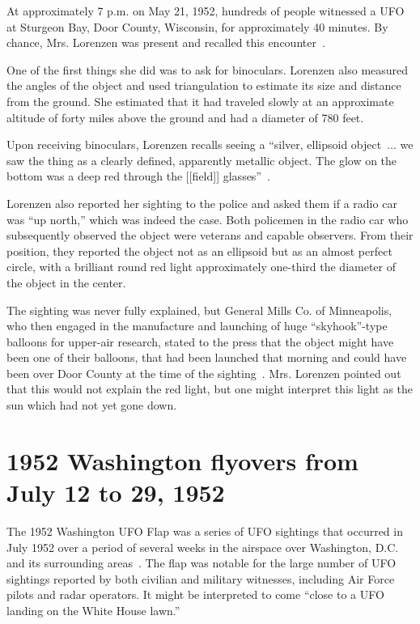 
At approximately 7 p.m. on May 21, 1952, hundreds of people witnessed a UFO at Sturgeon Bay, Door County, Wisconsin, for approximately 40 minutes.
By chance, Mrs. Lorenzen was present and recalled this encounter~\cite[Chapter~3]{Lorenzen1966Jan}.

One of the first things she did was to ask for binoculars. Lorenzen also measured the angles of the object and used triangulation to estimate its size and distance from the ground. She estimated that it had traveled slowly at an approximate altitude of
forty miles above the ground and had a diameter of 780 feet.

Upon receiving binoculars, Lorenzen recalls seeing a ``silver, ellipsoid object~$\ldots$ we saw the thing as a clearly
defined, apparently metallic object. The glow on the bottom
was a deep red through the [[field]] glasses''~\cite[pp.~31,~33]{Lorenzen1966Jan}.

Lorenzen also reported her sighting to the police and asked them if a radio car was ``up north,''
which was indeed the case. Both policemen in the radio car who subsequently observed the object were veterans and capable observers.
From their position, they reported the object not as an ellipsoid but as an almost perfect circle,
with a brilliant round red light approximately one-third the diameter of the object in the center.


The sighting was never fully explained, but General Mills Co. of Minneapolis,
who then engaged in the manufacture and launching of huge ``skyhook''-type balloons for upper-air research,
stated to the press that the object might have been one of their balloons,
that had been launched that morning and could have been over Door County at the time of the sighting~\cite[p.~34]{Lorenzen1966Jan}.
Mrs. Lorenzen pointed out that this would not explain the red light,
but one might interpret this light as the sun which had not yet gone down.

\section{1952 Washington flyovers from July 12 to 29, 1952}
\label{2023-UFO-part-History-chapter-post-1945-pre-1953-WF52}

The 1952 Washington UFO Flap was a series of UFO sightings that occurred in July 1952 over a period of several weeks in the airspace over Washington, D.C. and its surrounding areas~\cite{Ruppelt2011May}. The flap was notable for the large number of UFO sightings reported by both civilian and military witnesses, including Air Force pilots and radar operators.
It might be interpreted to come ``close to a UFO landing on the White House lawn.''

